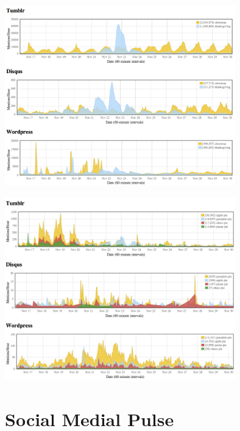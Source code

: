 \documentclass{beamer}
\begin{document}
\begin{frame}
  \begin{center}
    \includegraphics[width=10cm]{./imgs/t-dayvsx-mas.png}
  \end{center}
\end{frame}

\begin{frame}
  \begin{center}
    \includegraphics[width=10cm]{./imgs/pies2012.png}
  \end{center}
\end{frame}

\section{Social Medial Pulse}
{
\begin{frame}
\textcolor{black} {
\hfill \Huge \insertsection}
\end{frame}
}
\end{document}
